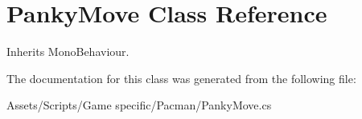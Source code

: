 \hypertarget{class_panky_move}{\section{Panky\-Move Class Reference}
\label{class_panky_move}
}


Inherits Mono\-Behaviour.



The documentation for this class was generated from the following file\-:\begin{DoxyCompactItemize}
\item 
Assets/\-Scripts/\-Game specific/\-Pacman/Panky\-Move.\-cs\end{DoxyCompactItemize}
